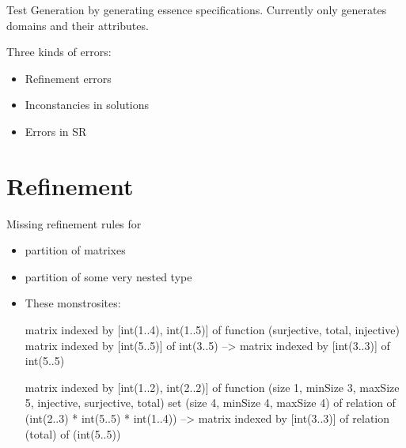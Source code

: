 
\usepackage[left=48pt,right=46pt]{geometry}

\title{}
\author{Bilal Syed Hussain}
\pagestyle{plain}


\maketitle

Test Generation by generating essence specifications. Currently only generates domains and their attributes.

Three kinds of errors:

\begin{itemize}
	\item Refinement errors
	\item Inconstancies in solutions 
	\item Errors in SR
\end{itemize}

\section{Refinement}

Missing refinement rules for 

\begin{itemize}
	\item partition of matrixes
	\item partition of some very nested type
	\item These monstrosites: \begin{lst:essence}
	matrix indexed by [int(1..4), int(1..5)] of function (surjective,
				  total,
				  injective)
			matrix indexed by [int(5..5)] of int(3..5)
				--> matrix indexed by [int(3..3)] of int(5..5)
	\end{lst:essence}
	
	\begin{lst:essence}
    matrix indexed by [int(1..2), int(2..2)] of function (size 1,
          minSize 3,
          maxSize 5,
          injective,
          surjective,
          total)
    set (size 4,
         minSize 4,
         maxSize 4) of
        relation of
            (int(2..3) *
             int(5..5) *
             int(1..4))
        --> matrix indexed by [int(3..3)] of relation (total) of                          (int(5..5))
	\end{lst:essence}
	
	
\end{itemize}


